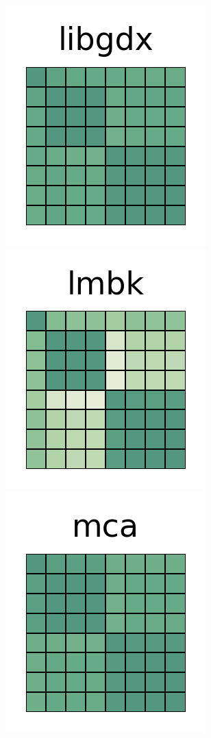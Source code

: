 \documentclass[10pt,conference]{IEEEtran}
\begin{document}
\begin{figure}[htb!]
 \includegraphics[width=\heatmapWidth, keepaspectratio]{entropy-correlations/libgdx-grids.png}
 \includegraphics[width=\heatmapWidth, keepaspectratio]{entropy-correlations/lombok-grids.png}
 \includegraphics[width=\heatmapWidth, keepaspectratio]{entropy-correlations/material-components-android-grids.png} \\

\end{figure}
\end{document}
